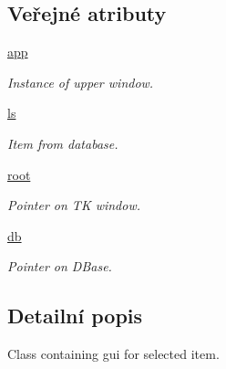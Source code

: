 \subsection*{Veřejné atributy}
\begin{DoxyCompactItemize}
\item 
\hypertarget{classmnWindow_1_1mnItem_a6938c30770e4a044a762888597d08f5f}{\hyperlink{classmnWindow_1_1mnItem_a6938c30770e4a044a762888597d08f5f}{app}}\label{classmnWindow_1_1mnItem_a6938c30770e4a044a762888597d08f5f}

\begin{DoxyCompactList}\small\item\em Instance of upper window. \end{DoxyCompactList}\item 
\hypertarget{classmnWindow_1_1mnItem_ad9c3fb1fd3637cc505dc8e03c0d4b7dd}{\hyperlink{classmnWindow_1_1mnItem_ad9c3fb1fd3637cc505dc8e03c0d4b7dd}{ls}}\label{classmnWindow_1_1mnItem_ad9c3fb1fd3637cc505dc8e03c0d4b7dd}

\begin{DoxyCompactList}\small\item\em Item from database. \end{DoxyCompactList}\item 
\hypertarget{classmnWindow_1_1mnItem_aadaa7063be7f422fad9f9282d01c7209}{\hyperlink{classmnWindow_1_1mnItem_aadaa7063be7f422fad9f9282d01c7209}{root}}\label{classmnWindow_1_1mnItem_aadaa7063be7f422fad9f9282d01c7209}

\begin{DoxyCompactList}\small\item\em Pointer on T\-K window. \end{DoxyCompactList}\item 
\hypertarget{classmnWindow_1_1mnItem_aca705dc598d43c6fedeeae7492157f3f}{\hyperlink{classmnWindow_1_1mnItem_aca705dc598d43c6fedeeae7492157f3f}{db}}\label{classmnWindow_1_1mnItem_aca705dc598d43c6fedeeae7492157f3f}

\begin{DoxyCompactList}\small\item\em Pointer on D\-Base. \end{DoxyCompactList}\end{DoxyCompactItemize}


\subsection{Detailní popis}
Class containing gui for selected item. 


